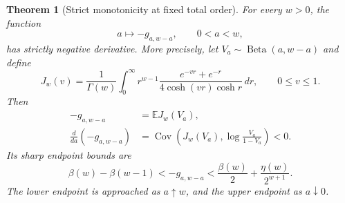\documentclass[11pt,a4paper]{article}
\numberwithin{equation}{section}
\newtheorem{theorem}{Theorem}[section]
\theoremstyle{definition}
\theoremstyle{remark}
\begin{document}
\begin{theorem}[Strict monotonicity at fixed total order]\label{thm:allocation}
For every $w>0$, the function
\[
 a\longmapsto -g_{a,w-a},\qquad 0<a<w,
\]
has strictly negative derivative. More precisely, let
$V_a\sim\operatorname{Beta}(a,w-a)$ and define
\begin{equation}\label{eq:Jw}
 J_w(v)=\frac1{\Gamma(w)}\int_0^\infty
 r^{w-1}\frac{e^{-vr}+e^{-r}}{4\cosh(vr)\cosh r}\,dr,
 \qquad 0\le v\le1.
\end{equation}
Then
\begin{align}
 -g_{a,w-a}&=\mathbb E J_w(V_a),\label{eq:betaallocation}\\
 \frac{d}{da}(-g_{a,w-a})
 &=\operatorname{Cov}\!\left(J_w(V_a),
          \log\frac{V_a}{1-V_a}\right)<0.\label{eq:covariance}
\end{align}
Its sharp endpoint bounds are
\begin{equation}\label{eq:sharpgaussian}
 \boxed{\quad
 \beta(w)-\beta(w-1)<-g_{a,w-a}
 <\frac{\beta(w)}2+\frac{\eta(w)}{2^{w+1}}.
 \quad}
\end{equation}
The lower endpoint is approached as $a\uparrow w$, and the upper endpoint
as $a\downarrow0$.
\end{theorem}
\end{document}
